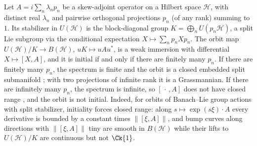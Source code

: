 \begin{remark}
  \label{rem:sub-unitary-orbits}
  Let $A = i\sum_n \lambda_n p_n$ be a skew-adjoint operator on a Hilbert space $\mathcal{H}$,
  with distinct real $\lambda_n$ and pairwise orthogonal projections $p_n$ (of any rank) summing
  to $1$. Its stabilizer in $U(\mathcal{H})$ is the block-diagonal group
  $K = \bigoplus_n U(p_n\mathcal{H})$, a split Lie subgroup via the conditional expectation
  $X \mapsto \sum_n p_n X p_n$. The orbit map $U(\mathcal{H})/K \to B(\mathcal{H})$,
  $uK \mapsto uAu^*$, is a weak immersion with differential $X \mapsto [X, A]$, and it is
  initial if and only if there are finitely many $p_n$.
  If there are finitely many $p_n$, the spectrum is finite and the orbit is a closed embedded
  split submanifold \cite{BL23}; with two projections of infinite rank it is a Grassmannian.
  If there are infinitely many $p_n$, the spectrum is infinite, so $[\,\cdot\,, A]$ does not
  have closed range \cite{BL23}, and the orbit is not initial. Indeed, for orbits of Banach--Lie
  group actions with split stabilizer, initiality forces closed range: along
  $s \mapsto \exp(s\xi)\cdot A$ every derivative is bounded by a constant times
  $\|[\xi, A]\|$, and bump curves along directions with $\|[\xi, A]\|$ tiny are smooth in
  $B(\mathcal{H})$ while their lifts to $U(\mathcal{H})/K$ are continuous but not $\Ck{1}$.
\end{remark}

